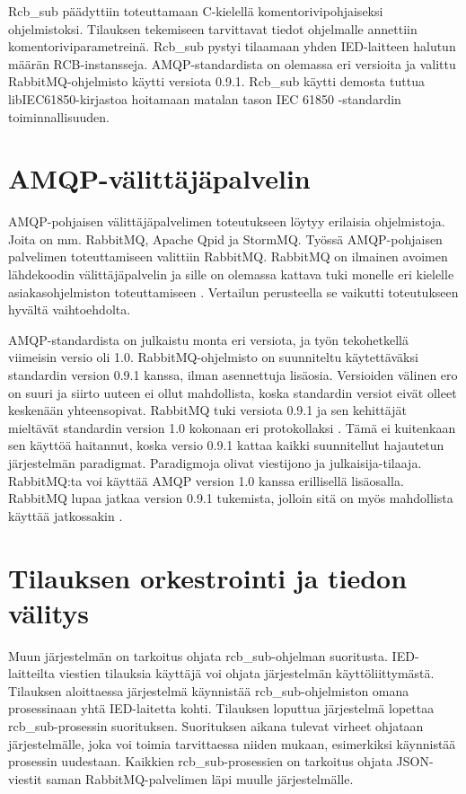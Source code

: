 Rcb\_sub päädyttiin toteuttamaan C-kielellä komentorivipohjaiseksi ohjelmistoksi. Tilauksen tekemiseen tarvittavat tiedot ohjelmalle annettiin komentoriviparametreinä. Rcb\_sub pystyi tilaamaan yhden IED-laitteen halutun määrän RCB-instansseja. AMQP-stan\-dar\-dis\-ta on olemassa eri versioita ja valittu RabbitMQ-ohjelmisto käytti versiota 0.9.1. Rcb\_sub käytti demosta tuttua libIEC61850-kirjastoa hoitamaan matalan tason IEC 61850 -stan\-dar\-din toiminnallisuuden.


\section{AMQP-välittäjäpalvelin}
AMQP-pohjaisen välittäjäpalvelimen toteutukseen löytyy erilaisia ohjelmistoja. Joita on mm. RabbitMQ, Apache Qpid ja StormMQ. Työssä AMQP-pohjaisen palvelimen toteuttamiseen valittiin RabbitMQ. RabbitMQ on ilmainen avoimen lähdekoodin välittäjäpalvelin ja sille on olemassa kattava tuki monelle eri kielelle asiakasohjelmiston toteuttamiseen \cite{rabbitmq-supported-languages}. Vertailun perusteella se vaikutti toteutukseen hyvältä vaihtoehdolta.

AMQP-standardista on julkaistu monta eri versiota, ja työn tekohetkellä viimeisin versio oli 1.0. RabbitMQ-ohjelmisto on suunniteltu käytettäväksi standardin version 0.9.1 kanssa, ilman asennettuja lisäosia. Versioiden välinen ero on suuri ja siirto uuteen ei ollut mahdollista, koska standardin versiot eivät olleet keskenään yhteensopivat. RabbitMQ tuki versiota 0.9.1 ja sen kehittäjät mieltävät standardin version 1.0 kokonaan eri protokollaksi \cite{RabbitMQ-Compatibility-and-Conformance}. Tämä ei kuitenkaan sen käyttöä haitannut, koska versio 0.9.1 kattaa kaikki suunnitellut hajautetun järjestelmän paradigmat. Paradigmoja olivat viestijono ja julkaisija-tilaaja. RabbitMQ:ta voi käyttää AMQP version 1.0 kanssa erillisellä lisäosalla. RabbitMQ lupaa jatkaa version 0.9.1 tukemista, jolloin sitä on myös mahdollista käyttää jatkossakin \cite{RabbitMQ-Compatibility-and-Conformance}.


\section{Tilauksen orkestrointi ja tiedon välitys}
Muun järjestelmän on tarkoitus ohjata rcb\_sub-ohjelman suoritusta. IED-laitteilta viestien tilauksia käyttäjä voi ohjata järjestelmän käyttöliittymästä. Tilauksen aloittaessa järjestelmä käynnistää rcb\_sub-ohjelmiston omana prosessinaan yhtä IED-laitetta kohti. Tilauksen loputtua järjestelmä lopettaa rcb\_sub-prosessin suorituksen. Suorituksen aikana tulevat virheet ohjataan järjestelmälle, joka voi toimia tarvittaessa niiden mukaan, esimerkiksi käynnistää prosessin uudestaan. Kaikkien rcb\_sub-prosessien on tarkoitus ohjata JSON-viestit saman RabbitMQ-palvelimen läpi muulle järjestelmälle.

